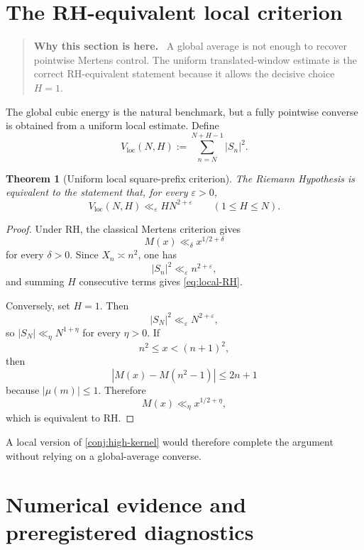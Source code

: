 \documentclass[11pt]{article}
\newtheorem{theorem}{Theorem}[section]
\theoremstyle{definition}
\theoremstyle{remark}
\newcommand{\eps}{\varepsilon}
\newcommand{\1}{\mathbf{1}}
\newenvironment{motivation}
  {\begin{quote}\small\color{ovvogray}\textbf{Why this section is here.}\ }
  {\end{quote}}
\begin{document}
\section{The RH-equivalent local criterion}
\label{sec:local-criterion}

\begin{motivation}
A global average is not enough to recover pointwise Mertens control.  The uniform translated-window estimate is the correct RH-equivalent statement because it allows the decisive choice $H=1$.
\end{motivation}

The global cubic energy is the natural benchmark, but a fully pointwise converse is obtained from a uniform local estimate.  Define
\begin{equation}
 V_{\mathrm{loc}}(N,H)
 :=\sum_{n=N}^{N+H-1}|S_n|^2.
 \label{eq:Vloc}
\end{equation}

\begin{theorem}[Uniform local square-prefix criterion]
\label{thm:local-RH}
The Riemann Hypothesis is equivalent to the statement that, for every $\eps>0$,
\begin{equation}
 V_{\mathrm{loc}}(N,H)
 \ll_\eps HN^{2+\eps}
 \qquad(1\le H\le N).
 \label{eq:local-RH}
\end{equation}
\end{theorem}

\begin{proof}
Under RH, the classical Mertens criterion gives
\[
 M(x)\ll_\delta x^{1/2+\delta}
\]
for every $\delta>0$.  Since $X_n\asymp n^2$, one has
\[
 |S_n|^2\ll_\eps n^{2+\eps},
\]
and summing $H$ consecutive terms gives \cref{eq:local-RH}.

Conversely, set $H=1$.  Then
\[
 |S_N|^2\ll_\eps N^{2+\eps},
\]
so $|S_N|\ll_\eta N^{1+\eta}$ for every $\eta>0$.  If
\[
 n^2\le x<(n+1)^2,
\]
then
\[
 |M(x)-M(n^2-1)|\le2n+1
\]
because $|\mu(m)|\le1$.  Therefore
\[
 M(x)\ll_\eta x^{1/2+\eta},
\]
which is equivalent to RH.
\end{proof}

A local version of \cref{conj:high-kernel} would therefore complete the argument without relying on a global-average converse.

\section{Numerical evidence and preregistered diagnostics}
\label{sec:numerics}
\end{document}
